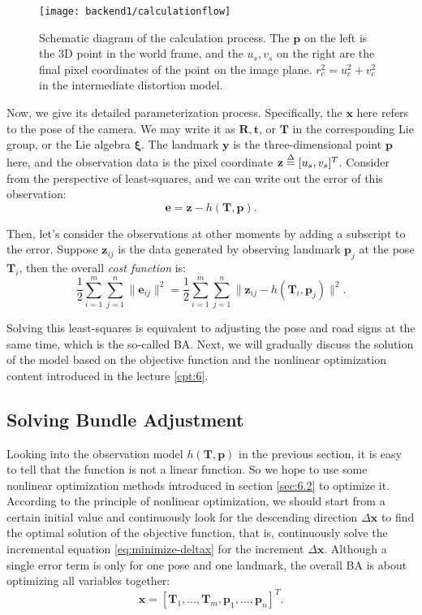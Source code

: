 \begin{figure}[!htp]
	\centering
	\texttt{[image: backend1/calculationflow]}
	\caption{Schematic diagram of the calculation process. The $\mathbf{p}$ on the left is the 3D point in the world frame, and the $u_s, v_s$ on the right are the final pixel coordinates of the point on the image plane. $r_c^2=u_c^2 + v_c^2$ in the intermediate distortion model.}
	\label{fig:calculationflow}
\end{figure}


Now, we give its detailed parameterization process. Specifically, the $\mathbf{x}$ here refers to the pose of the camera. We may write it as $\mathbf{R}, \mathbf{t}$, or $\mathbf{T }$ in the corresponding Lie group, or the  Lie algebra $\mathbf{\xi}$. The landmark $\mathbf{y}$ is the three-dimensional point $\mathbf{p}$ here, and the observation data is the pixel coordinate $\mathbf{z} \buildrel \Delta \over = [u_s, v_s]^T $. Consider from the perspective of least-squares, and we can write out the error of this observation:
\begin{equation}
	\mathbf{e} = \mathbf{z} - h(\mathbf{T}, \mathbf{p}).
\end{equation}

Then, let's consider the observations at other moments by adding a subscript to the error. Suppose $\mathbf{z}_{ij}$ is the data generated by observing landmark $\mathbf{p}_j$ at the pose $\mathbf{T}_i$, then the overall \textit{cost function} is:
\begin{equation}
	\label{eq:BAcostfunction}
	\frac{1}{2}\sum_{i=1}^m \sum_{j=1}^n \| \mathbf{e}_{ij} \|^2 = \frac{1}{2}\sum_{i=1}^m\sum_{j=1}^n \|
	\mathbf{{z}}_{ij} - h(\mathbf{T}_{i},\mathbf{p}_j) \|^2 .
\end{equation}


Solving this least-squares is equivalent to adjusting the pose and road signs at the same time, which is the so-called BA. Next, we will gradually discuss the solution of the model based on the objective function and the nonlinear optimization content introduced in the lecture \ref{cpt:6}.

\subsection{Solving Bundle Adjustment}
Looking into the observation model $h(\mathbf{T}, \mathbf{p})$ in the previous section, it is easy to tell that the function is not a linear function. So we hope to use some nonlinear optimization methods introduced in section \ref{sec:6.2} to optimize it. According to the principle of nonlinear optimization, we should start from a certain initial value and continuously look for the descending direction $\Delta \mathbf{x}$ to find the optimal solution of the objective function, that is, continuously solve the incremental equation \eqref{eq:minimize-deltax} for the increment $\Delta \mathbf{x}$. Although a single error term is only for one pose and one landmark, the overall BA is about optimizing all variables together: 
\begin{equation}
	\mathbf{x} = [ \mathbf{T}_1, \ldots, \mathbf{T}_m, \mathbf{p}_1, \ldots, \mathbf{p}_n ]^T.
\end{equation}

